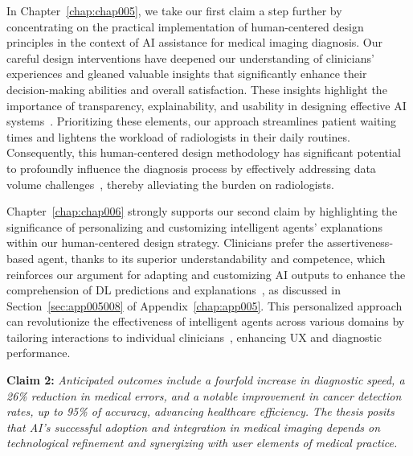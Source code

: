 \textcolor{revised}{In Chapter~\ref{chap:chap005}, we take our first claim a step further by concentrating on the practical implementation of human-centered design principles in the context of \ac{AI} assistance for medical imaging diagnosis.
Our careful design interventions have deepened our understanding of clinicians' experiences and gleaned valuable insights that significantly enhance their decision-making abilities and overall satisfaction.
These insights highlight the importance of transparency, explainability, and usability in designing effective \ac{AI} systems~\cite{10.1145/3544548.3580945}.
Prioritizing these elements, our approach streamlines patient waiting times and lightens the workload of radiologists in their daily routines.
Consequently, this human-centered design methodology has significant potential to profoundly influence the diagnosis process by effectively addressing data volume challenges~\cite{doi:10.1148/radiol.210948}, thereby alleviating the burden on radiologists.}

\textcolor{revised}{Chapter~\ref{chap:chap006} strongly supports our second claim by highlighting the significance of personalizing and customizing intelligent agents' explanations within our human-centered design strategy.
Clinicians prefer the assertiveness-based agent, thanks to its superior understandability and competence, which reinforces our argument for adapting and customizing \ac{AI} outputs to enhance the comprehension of \ac{DL} predictions and explanations~\cite{Cai:2019:EEE:3301275.3302289}, as discussed in Section~\ref{sec:app005008} of Appendix~\ref{chap:app005}.
This personalized approach can revolutionize the effectiveness of intelligent agents across various domains by tailoring interactions to individual clinicians~\cite{10.1145/3544548.3581393}, enhancing \ac{UX} and diagnostic performance.}

\vspace{1.00mm}

\begin{displayquote}
{\bf Claim 2:}
{\it
\textcolor{revised}{Anticipated outcomes include a fourfold increase in diagnostic speed, a 26\% reduction in medical errors, and a notable improvement in cancer detection rates, up to 95\% of accuracy, advancing healthcare efficiency.
The thesis posits that \acs{AI}'s successful adoption and integration in medical imaging depends on technological refinement and synergizing with user elements of medical practice.}
}
\end{displayquote}

